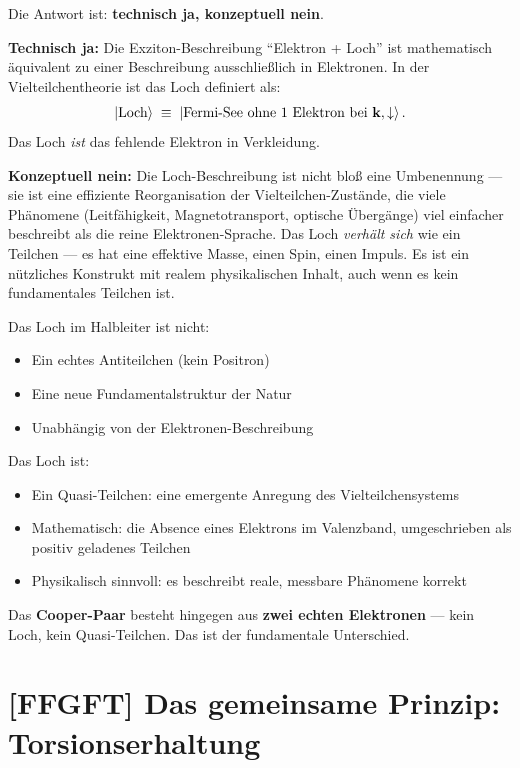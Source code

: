 Die Antwort ist: \textbf{technisch ja, konzeptuell nein}.

\textbf{Technisch ja:}
Die Exziton-Beschreibung ``Elektron + Loch'' ist mathematisch
äquivalent zu einer Beschreibung ausschließlich in Elektronen.
In der Vielteilchentheorie ist das Loch definiert als:
\begin{equation}
  \left|\text{Loch}\right\rangle \;\equiv\; \left|\text{Fermi-See ohne 1 Elektron bei }
  \mathbf{k}, \downarrow\right\rangle.
\end{equation}
Das Loch \emph{ist} das fehlende Elektron in Verkleidung.

\textbf{Konzeptuell nein:}
Die Loch-Beschreibung ist nicht bloß eine Umbenennung ---
sie ist eine effiziente Reorganisation der Vielteilchen-Zustände,
die viele Phänomene (Leitfähigkeit, Magnetotransport,
optische Übergänge) viel einfacher beschreibt als die
reine Elektronen-Sprache.
Das Loch \emph{verhält sich} wie ein Teilchen --- es hat
eine effektive Masse, einen Spin, einen Impuls.
Es ist ein nützliches Konstrukt mit realem physikalischen Inhalt,
auch wenn es kein fundamentales Teilchen ist.

\begin{keypoint}
Das Loch im Halbleiter ist nicht:
\begin{itemize}
  \item Ein echtes Antiteilchen (kein Positron)
  \item Eine neue Fundamentalstruktur der Natur
  \item Unabhängig von der Elektronen-Beschreibung
\end{itemize}

Das Loch ist:
\begin{itemize}
  \item Ein Quasi-Teilchen: eine emergente Anregung des
    Vielteilchensystems
  \item Mathematisch: die Absence eines Elektrons im
    Valenzband, umgeschrieben als positiv geladenes Teilchen
  \item Physikalisch sinnvoll: es beschreibt reale,
    messbare Phänomene korrekt
\end{itemize}

Das \textbf{Cooper-Paar} besteht hingegen aus
\textbf{zwei echten Elektronen} --- kein Loch,
kein Quasi-Teilchen. Das ist der fundamentale Unterschied.
\end{keypoint}

\section{[FFGFT] Das gemeinsame Prinzip: Torsionserhaltung}
\label{sec:torsionserhaltung}

